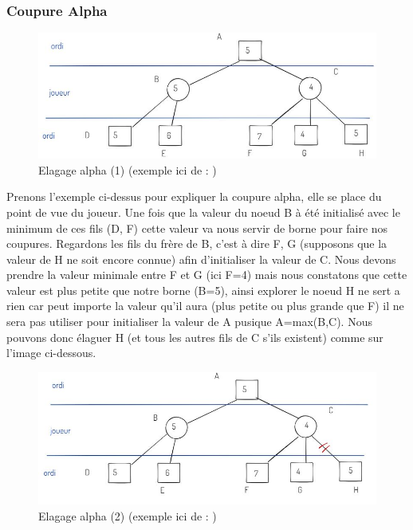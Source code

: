 \documentclass[12pt]{article}
\begin{document}
	\subsubsection{Coupure Alpha}
	    \label{coupure_alpha}
	    \begin{figure}[htbp]
            \centering
            \includegraphics[width=.8\linewidth]{images/elagage_alpha.JPG}
            \caption{Elagage alpha (1) (exemple ici de : \cite{elagage_alpha_beta})}
            \label{fig:elagage_alpha}
        \end{figure}
    
    	Prenons l'exemple ci-dessus pour expliquer la coupure alpha, elle se place du point de vue du joueur. Une fois que la valeur du noeud B à été initialisé avec le minimum de ces fils (D, F) cette valeur va nous servir de borne pour faire nos coupures. Regardons les fils du frère de B, c'est à dire F, G (supposons que la valeur de H ne soit encore connue) afin d'initialiser la valeur de C. Nous devons prendre la valeur minimale entre F et G (ici F=4) mais nous constatons que cette valeur est plus petite que notre borne (B=5), ainsi explorer le noeud H ne sert a rien car peut importe la valeur qu'il aura (plus petite ou plus grande que F) il ne sera pas
    	utiliser pour initialiser la valeur de A pusique A=max(B,C). Nous pouvons donc élaguer H (et tous les autres fils
    	de C s'ils existent) comme sur l'image ci-dessous.
    
    	\begin{figure}[htbp]
            \centering
            \includegraphics[width=.8\linewidth]{images/elagage_alpha_suite.JPG}
            \caption{Elagage alpha (2) (exemple ici de : \cite{elagage_alpha_beta})}
            \label{fig:elagage_alpha_suite}
        \end{figure}
\end{document}
